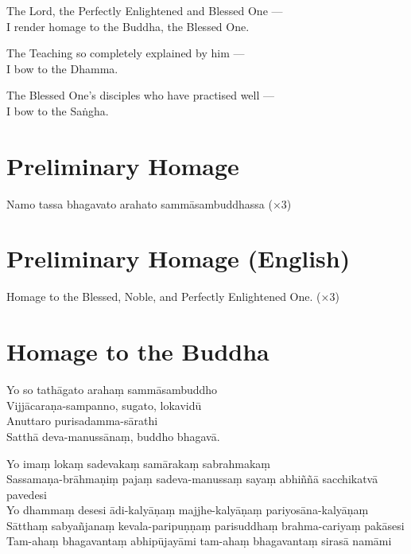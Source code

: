 The Lord, the Perfectly Enlightened and Blessed One ---\\
I render homage to the Buddha, the Blessed One.

The Teaching so completely explained by him ---\\
I bow to the Dhamma.

The Blessed One's disciples who have practised well ---\\
I bow to the Saṅgha.

\section*{Preliminary Homage}

\begin{leader}
\end{leader}

Namo tassa bhagavato arahato sammāsambuddhassa (×3)

\section*{Preliminary Homage (English)}

\begin{leader}
\end{leader}

Homage to the Blessed, Noble, and Perfectly Enlightened One. (×3)

\section*{Homage to the Buddha}

\begin{leader}
\end{leader}

Yo so tathāgato arahaṃ sammāsambuddho\\
Vijjācaraṇa-sampanno, sugato, lokavidū\\
Anuttaro purisadamma-sārathi\\
Satthā deva-manussānaṃ, buddho bhagavā.

Yo imaṃ lokaṃ sadevakaṃ samārakaṃ sabrahmakaṃ\\
Sassamaṇa-brāhmaṇiṃ pajaṃ sadeva-manussaṃ sayaṃ abhiññā sacchikatvā pavedesi\\
Yo dhammaṃ desesi ādi-kalyāṇaṃ majjhe-kalyāṇaṃ pariyosāna-kalyāṇaṃ\\
Sātthaṃ sabyañjanaṃ kevala-paripuṇṇaṃ parisuddhaṃ brahma-cariyaṃ pakāsesi\\
Tam-ahaṃ bhagavantaṃ abhipūjayāmi tam-ahaṃ bhagavantaṃ sirasā namāmi

